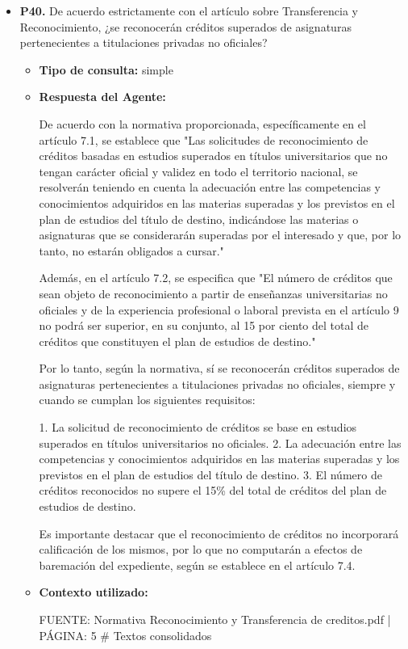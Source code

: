 \documentclass{article}
\begin{document}
\begin{itemize}
\begin{itemize}
\begin{scriptsize}
                  15
                \end{scriptsize}
        \end{itemize}


  \item \textbf{P40.} De acuerdo estrictamente con el artículo sobre Transferencia y Reconocimiento, ¿se reconocerán créditos superados de asignaturas pertenecientes a titulaciones privadas no oficiales? \\
        \begin{itemize}
          \item \textbf{Tipo de consulta:} simple
          \item \textbf{Respuesta del Agente:}

                De acuerdo con la normativa proporcionada, específicamente en el artículo 7.1, se establece que "Las solicitudes de reconocimiento de créditos basadas en estudios superados en títulos universitarios que no tengan carácter oficial y validez en todo el territorio nacional, se resolverán teniendo en cuenta la adecuación entre las competencias y conocimientos adquiridos en las materias superadas y los previstos en el plan de estudios del título de destino, indicándose las materias o asignaturas que se considerarán superadas por el interesado y que, por lo tanto, no estarán obligados a cursar."

                Además, en el artículo 7.2, se especifica que "El número de créditos que sean objeto de reconocimiento a partir de enseñanzas universitarias no oficiales y de la experiencia profesional o laboral prevista en el artículo 9 no podrá ser superior, en su conjunto, al 15 por ciento del total de créditos que constituyen el plan de estudios de destino."

                Por lo tanto, según la normativa, sí se reconocerán créditos superados de asignaturas pertenecientes a titulaciones privadas no oficiales, siempre y cuando se cumplan los siguientes requisitos:

                1. La solicitud de reconocimiento de créditos se base en estudios superados en títulos universitarios no oficiales.
                2. La adecuación entre las competencias y conocimientos adquiridos en las materias superadas y los previstos en el plan de estudios del título de destino.
                3. El número de créditos reconocidos no supere el 15\% del total de créditos del plan de estudios de destino.

                Es importante destacar que el reconocimiento de créditos no incorporará calificación de los mismos, por lo que no computarán a efectos de baremación del expediente, según se establece en el artículo 7.4.
          \item \textbf{Contexto utilizado:}
                \begin{scriptsize}
                  FUENTE: Normativa Reconocimiento y Transferencia de creditos.pdf | PÁGINA: 5
                  \# Textos consolidados


\end{scriptsize}
\end{itemize}
\end{itemize}
\end{document}
